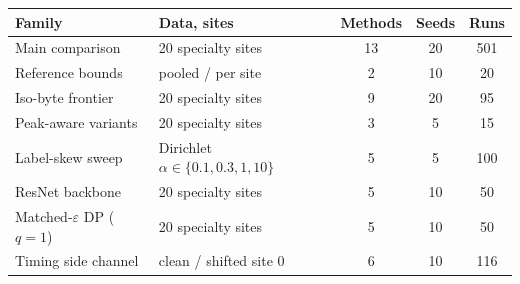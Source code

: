 \begin{tabular}{@{}llccc@{}}
\toprule
Family & Data, sites & Methods & Seeds & Runs\\
\midrule
Main comparison & 20 specialty sites & 13 & 20 & 501\\
Reference bounds & pooled / per site & 2 & 10 & 20\\
Iso-byte frontier & 20 specialty sites & 9 & 20 & 95\\
Peak-aware variants & 20 specialty sites & 3 & 5 & 15\\
Label-skew sweep & Dirichlet $\alpha\in\{0.1,0.3,1,10\}$ & 5 & 5 & 100\\
ResNet backbone & 20 specialty sites & 5 & 10 & 50\\
Matched-$\varepsilon$ DP ($q=1$) & 20 specialty sites & 5 & 10 & 50\\
Timing side channel & clean / shifted site 0 & 6 & 10 & 116\\
\bottomrule
\end{tabular}
